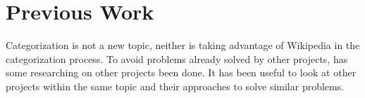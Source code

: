 \chapter{Previous Work}
Categorization is not a new topic, neither is taking advantage of Wikipedia in the categorization process. To avoid problems already solved by other projects, has some researching on other projects been done. It has been useful to look at other projects within the same topic and their approaches to solve similar problems. 






